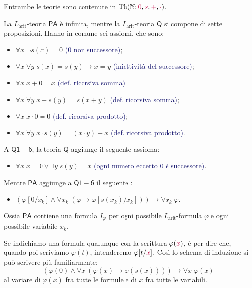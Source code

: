 Entrambe le teorie sono contenute in \(\operatorname{Th}(\mathbb N;\textcolor{purple}{0},\textcolor{purple}{s},\textcolor{purple}{+},\textcolor{purple}{\cdot})\).

\begin{definition}
    La $L_{\text{arit}}$-teoria $\mathsf{PA}$ è infinita, mentre la $L_{\text{arit}}$-teoria $\mathsf{Q}$ si compone di sette proposizioni. Hanno in comune sei assiomi, che sono:
    \begin{itemize}
        \item [\purple{$\mathsf{Q1}$}] $\forall x \; \neg s(x) = 0$ \textcolor{MidnightBlue}{(0 non successore)};
        \item [\purple{$\mathsf{Q2}$}] $\forall x \; \forall y \; s(x) = s(y) \to x = y$ \textcolor{MidnightBlue}{(iniettività del successore)};
        \item [\purple{$\mathsf{Q3}$}] $\forall x \; x + 0 = x$ \textcolor{MidnightBlue}{(def. ricorsiva somma)};
        \item [\purple{$\mathsf{Q4}$}] $\forall x \; \forall y \; x + s(y) = s(x + y)$ \textcolor{MidnightBlue}{(def. ricorsiva somma)};
        \item [\purple{$\mathsf{Q5}$}] $\forall x \; x \cdot 0 = 0$ \textcolor{MidnightBlue}{(def. ricorsiva prodotto)};
        \item [\purple{$\mathsf{Q6}$}] $\forall x \; \forall y \; x \cdot s(y) = (x \cdot y) + x$ \textcolor{MidnightBlue}{(def. ricorsiva prodotto)}.
    \end{itemize}
    A $\mathsf{Q1-6}$, la teoria $\mathsf{Q}$ aggiunge il seguente assioma:
    \begin{itemize}
        \item [\purple{$\mathsf{Q7}$}] $\forall x \; x = 0 \lor \exists y \; s(y) = x$ \textcolor{MidnightBlue}{(ogni numero eccetto 0 è successore)}.
    \end{itemize}
    Mentre $\mathsf{PA}$ aggiunge a $\mathsf{Q1-6}$ il seguente :
    \begin{itemize}
        \item [\purple{$\mathsf{I}_\varphi$}] $(\varphi[0/x_k] \land \forall x_k \; (\varphi \to \varphi[s(x_k)/x_k])) \to \forall x_k \; \varphi$.
    \end{itemize}
    Ossia $\mathsf{PA}$ contiene una formula $I_{\varphi}$ per ogni possibile $L_{\text{arit}}$-formula $\varphi$ e ogni possibile variabile $x_k$.
\end{definition}

\begin{notation}
    Se indichiamo una formula qualunque con la scrittura $\varphi(\textcolor{purple}{x})$, è per dire che, quando poi scriviamo $\varphi(t)$, intenderemo $\varphi[t/\textcolor{purple}{x}]$.
    Così lo schema di induzione si può scrivere più familiarmente:
    \[ (\varphi(0) \land \forall x \; (\varphi(x) \to \varphi(s(x)))) \to \forall x \; \varphi(x)
    \]
    al variare di $\varphi(x)$ fra tutte le formule e di $x$ fra tutte le variabili.
\end{notation}

